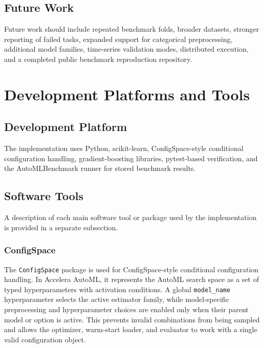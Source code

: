 \documentclass[12pt,a4paper,oneside]{report}
\newcommand{\systemname}{Accelera AutoML}
\begin{document}
\section{Future Work}

Future work should include repeated benchmark folds, broader datasets, stronger
reporting of failed tasks, expanded support for categorical preprocessing,
additional model families, time-series validation modes, distributed execution,
and a completed public benchmark reproduction repository.

\appendix
\renewcommand{\chaptername}{Appendix}

\chapter{Development Platforms and Tools}

\section{Development Platform}

The implementation uses Python, scikit-learn, ConfigSpace-style conditional
configuration handling, gradient-boosting libraries, pytest-based
verification, and the AutoMLBenchmark runner for stored benchmark results.

\section{Software Tools}

A description of each main software tool or package used by the implementation
is provided in a separate subsection.

\subsection{ConfigSpace}

The \texttt{ConfigSpace} package is used for ConfigSpace-style conditional
configuration handling. In \systemname{}, it represents the AutoML search space
as a set of typed hyperparameters with activation conditions. A global
\texttt{model\_name} hyperparameter selects the active estimator family, while
model-specific preprocessing and hyperparameter choices are enabled only when
their parent model or option is active. This prevents invalid combinations from
being sampled and allows the optimizer, warm-start loader, and evaluator to work
with a single valid configuration object.
\end{document}
